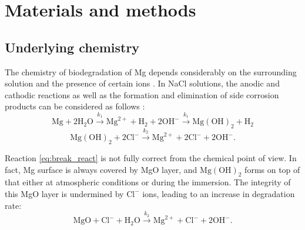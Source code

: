 \section{Materials and methods}


\subsection{Underlying chemistry}

The chemistry of biodegradation of Mg depends considerably on the surrounding solution and the presence of certain ions \cite{Mei2020}. In NaCl solutions, the anodic and cathodic reactions as well as the formation and elimination of side corrosion products can be considered as follows \cite{Zheng2014}:
\begin{equation} \label{eq:oxidation_react}
\mathrm{Mg}+2 \mathrm{H}_{2} \mathrm{O} \stackrel{k_{1}}{\rightarrow} \mathrm{Mg}^{2+}+\mathrm{H}_{2}+2 \mathrm{OH}^{-} \stackrel{k_{1}}{\rightarrow} \mathrm{Mg}(\mathrm{OH})_{2}+\mathrm{H}_{2}
\end{equation}
\begin{equation} \label{eq:break_react}
\mathrm{Mg}(\mathrm{OH})_{2}+2 \mathrm{Cl}^{-} \stackrel{k_{2}}{\rightarrow} \mathrm{Mg}^{2+}+2 \mathrm{Cl}^{-}+2 \mathrm{OH}^{-}.
\end{equation}

Reaction \ref{eq:break_react} is not fully correct from the chemical point of view. In fact, Mg surface is always covered by MgO layer, and $\mathrm{Mg}(\mathrm{OH})_{2}$ forms on top of that either at atmospheric conditions or during the immersion. The integrity of this MgO layer is undermined by $\mathrm{Cl}^{-}$ ions, leading to an increase in degradation rate:
\begin{equation} \label{eq:break_react_mgo}
\mathrm{MgO}+ \mathrm{Cl}^{-} + \mathrm{H}_{2} \mathrm{O} \stackrel{k_{2}}{\rightarrow} \mathrm{Mg}^{2+}+ \mathrm{Cl}^{-}+ 2\mathrm{OH}^{-}.
\end{equation}

